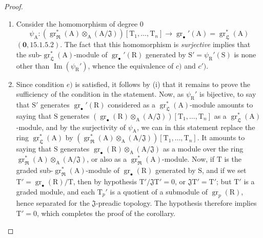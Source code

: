 \begin{proof}
\begin{enumerate}
\item[\rm(i)] Consider the homomorphism of degree $0$
\[
  \psi_\mathrm{A}:(\operatorname{gr}_\mathfrak{R}^*(\mathrm{A})\otimes_\mathrm{A}(\mathrm{A}/\mathfrak{J}))[\mathrm{T}_1,\ldots,\mathrm{T}_n]\to\operatorname{gr}_\bullet'(\mathrm{A})=\operatorname{gr}_\mathfrak{L}^*(\mathrm{A})
\]
$(\mathbf{0},15.1.5.2)$. The fact that this homomorphism is \emph{surjective} implies that the sub-$\operatorname{gr}_\mathfrak{L}^*(\mathrm{A})$-module of $\operatorname{gr}_\bullet'(\mathrm{R})$ generated by $\mathrm{S}'=\psi_\mathrm{R}'(\mathrm{S})$ is none other than $\operatorname{Im}(\psi_\mathrm{R}')$, whence the equivalence of $c)$ and $c')$.

\item[\rm(ii)] Since condition $e)$ is satisfied, it follows by (i) that it remains to prove the sufficiency of the condition in the statement. Now, as $\psi_\mathrm{R}'$ is bijective, to say that $\mathrm{S}'$ generates $\operatorname{gr}_\bullet'(\mathrm{R})$ considered as a $\operatorname{gr}_\mathfrak{L}^*(\mathrm{A})$-module amounts to saying that $\mathrm{S}$ generates $(\operatorname{gr}_\bullet(\mathrm{R})\otimes_\mathrm{A}(\mathrm{A}/\mathfrak{J}))[\mathrm{T}_1,\ldots,\mathrm{T}_n]$ as a $\operatorname{gr}_\mathfrak{L}^*(\mathrm{A})$-module, and by the surjectivity of $\psi_\mathrm{A}$, we can in this statement replace the ring $\operatorname{gr}_\mathfrak{L}^*(\mathrm{A})$ by $(\operatorname{gr}_\mathfrak{R}^*(\mathrm{A})\otimes_\mathrm{A}(\mathrm{A}/\mathfrak{J}))[\mathrm{T}_1,\ldots,\mathrm{T}_n]$. It amounts to saying that $\mathrm{S}$ generates $\operatorname{gr}_\bullet(\mathrm{R})\otimes_\mathrm{A}(\mathrm{A}/\mathfrak{J})$ as a module over the ring $\operatorname{gr}_\mathfrak{R}^*(\mathrm{A})\otimes_\mathrm{A}(\mathrm{A}/\mathfrak{J})$, or also as a $\operatorname{gr}_\mathfrak{R}^*(\mathrm{A})$-module. Now, if $\mathrm{T}$ is the graded sub-$\operatorname{gr}_\mathfrak{R}^*(\mathrm{A})$-module of $\operatorname{gr}_\bullet(\mathrm{R})$ generated by $\mathrm{S}$, and if we set $\mathrm{T}'=\operatorname{gr}_\bullet(\mathrm{R})/\mathrm{T}$, then by hypothesis $\mathrm{T}'/\mathfrak{J}\mathrm{T}'=0$, or $\mathfrak{J}\mathrm{T}'=\mathrm{T}'$; but $\mathrm{T}'$ is a graded module, and each $\mathrm{T}_p'$ is a quotient of a submodule of $\operatorname{gr}_p(\mathrm{R})$, hence separated for the $\mathfrak{J}$-preadic topology. The hypothesis therefore implies $\mathrm{T}'=0$, which completes the proof of the corollary.
\end{enumerate}
\end{proof}

